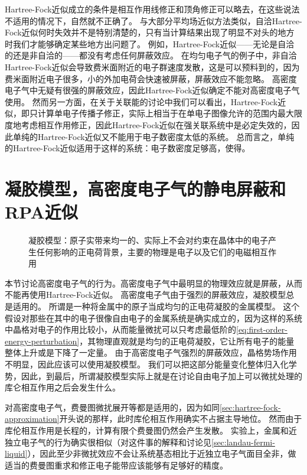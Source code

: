Hartree-Fock近似成立的条件是相互作用线修正和顶角修正可以略去，在这些说法不适用的情况下，自然就不正确了。
与大部分平均场近似方法类似，自洽Hartree-Fock近似何时失效并不是特别清楚的，只有当计算结果出现了明显不对头的地方时我们才能够确定某些地方出问题了。
例如，Hartree-Fock近似——无论是自洽的还是非自洽的——都没有考虑任何屏蔽效应。
在均匀电子气的例子中，非自洽Hartree-Fock近似会导致费米面附近的电子群速度发散，这是可以预料到的，因为费米面附近电子很多，小的外加电荷会快速被屏蔽，屏蔽效应不能忽略。
高密度电子气中无疑有很强的屏蔽效应，因此Hartree-Fock近似确定不能对高密度电子气使用。
然而另一方面，在关于关联能的讨论中我们可以看出，Hartree-Fock近似，即只计算单电子传播子修正，实际上相当于在单电子图像允许的范围内最大限度地考虑相互作用修正，因此Hartree-Fock近似在强关联系统中是必定失效的，因此单纯的Hartree-Fock近似又不能用于电子数密度太低的系统。
总而言之，单纯的Hartree-Fock近似适用于这样的系统：电子数密度足够高，使得。

\section{凝胶模型，高密度电子气的静电屏蔽和RPA近似}

\begin{figure}
    \centering
    
    \caption{凝胶模型：原子实带来均一的、实际上不会对约束在晶体中的电子产生任何影响的正电荷背景，主要的物理是电子以及它们的电磁相互作用}
\end{figure}

本节讨论高密度电子气的行为。高密度电子气中最明显的物理效应就是屏蔽，从而不能再使用Hartree-Fock近似。
高密度电子气由于强烈的屏蔽效应，凝胶模型总是适用的。
所谓是一种将金属中的原子当成均匀的正电荷凝胶的金属模型。
这个假设对那些在其中的电子很像自由电子的金属系统是确实成立的，因为这样的系统中晶格对电子的作用比较小，从而能量微扰可以只考虑最低阶的\eqref{eq:first-order-energy-perturbation}，其物理直观就是均匀的正电荷凝胶，它让所有电子的能量整体上升或是下降了一定量。
由于高密度电子气强烈的屏蔽效应，晶格势场作用不明显，因此应该可以使用凝胶模型。
我们可以把这部分能量变化整体归入化学势，因此，到最后，所谓凝胶模型实际上就是在讨论自由电子加上可以微扰处理的库仑相互作用之后会发生什么。

对高密度电子气，费曼图微扰展开等都是适用的，因为如同\autoref{sec:hartree-fock-approximation}开头说的那样，此时库伦相互作用确实不占据主导地位。
然而由于库伦相互作用是长程的，计算有限个费曼图仍然会产生发散。
实验上，金属和近独立电子气的行为确实很相似（对这件事的解释和讨论见\autoref{sec:landau-fermi-liquid}），因此至少非微扰效应不会让系统基态相比于近独立电子气面目全非，做适当的费曼图重求和修正电子能带应该能够有足够好的精度。

